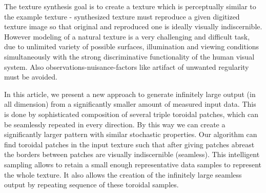 	The texture synthesis goal is to create a texture  which is perceptually similar to the example texture -  synthesized texture must reproduce a given digitized texture image so that original and reproduced one is ideally visually indiscernible.  However modeling of a natural texture is a very challenging and difficult task, due to unlimited variety of possible surfaces, illumination and viewing conditions simultaneously with the strong discriminative functionality of the human visual system. Also observations-nuisance-factors like artifact of unwanted regularity must be avoided.

	In this article, we present a new approach to generate infinitely large output (in all dimension) from a significantly smaller amount of measured input data. This is done by sophisticated composition of several  triple toroidal patches, which can be seamlessly repeated in every direction. 
By this way we can create a significantly larger pattern with similar stochastic properties. Our algorithm can find toroidal patches in the input texture such that after giving patches abreast the borders between patches are visually indiscernible (seamless). This intelligent sampling allows to retain a small enough representative data samples to represent the whole texture. It also allows the creation of the infinitely large seamless output by repeating sequence of these toroidal samples.

		

